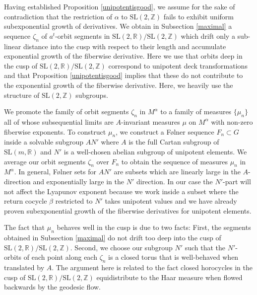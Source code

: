 \documentclass[10pt,reqno]{amsart}
\theoremstyle{Theorem}
\theoremstyle{definition}
\theoremstyle{remark}
\newcommand{\R}{\mathbb {R}}
\newcommand{\Z}{\mathbb {Z}}
\newcommand{\Sl}{\mathrm{SL}}
\def\Folner{F{\o}lner }
\begin{document}
Having established Proposition \ref{unipotentisgood},  we assume for the sake of  contradiction that the restriction of $\alpha$ to $\Sl(2,\Z)$ fails to exhibit uniform subexponential growth of derivatives.  We  obtain in Subsection \ref{maximal} a sequence $\zeta_n$ of $a^t$-orbit segments  in $\Sl(2, \R)/\Sl(2, \Z)$ which drift  only a sub-linear distance into the cusp with respect to their length and accumulate exponential growth of the fiberwise derivative.
Here we use that orbits deep in the cusp of $\Sl(2,\R)/\Sl(2,\Z)$ correspond to unipotent deck transformations and  that Proposition \ref{unipotentisgood} implies that these do not contribute to the exponential growth of the fiberwise derivative.
Here, we heavily use the structure of %
$\Sl(2,\Z)$ subgroups. %

We   promote the family of  orbit segments $\zeta_n$  in $M^\alpha$ to a family of  measures $\{\mu_n\}$ all of whose  subsequential limits   are $A$-invariant measures $\mu$ on $M^{\alpha}$ with non-zero fiberwise exponents. To construct $\mu_n$,   we construct a  \Folner sequence $F_n \subset G$ inside a  solvable subgroup $AN'$ where $A$ is the full Cartan subgroup of $\Sl(m,\R)$ and $N'$ is a well-chosen abelian subgroup of unipotent elements. We average our orbit segments $\zeta_n$  over  $F_n$ to obtain  the sequence of measures $\mu_n$ in $M^{\alpha}$. In general, \Folner sets for $AN'$ are subsets which are linearly large in the $A$-direction and exponentially large in the $N'$ direction. In our case the $N'$-part will not affect the Lyapunov exponent because we work inside a subset where the return cocycle $\beta$ restricted to $N'$ takes unipotent values and we have already proven subexponential growth of the fiberwise derivatives for unipotent elements.


The fact that $\mu_n$ behaves well in the cusp is due to two facts: First, the segments obtained in Subsection \ref{maximal} do not drift  too deep into the cusp of $\Sl(2,\R)/\Sl(2,\Z)$.   Second, we choose our subgroup $N'$ such that the $N'$-orbits of each  point  along each $\zeta_n$ is a closed torus that is  well-behaved when translated by $A$.  The argument here is related to the fact  closed horocycles in the cusp of $\Sl(2,\R)/\Sl(2,\Z)$ equidistribute  to the Haar measure when flowed backwards by the geodesic flow.
\end{document}
